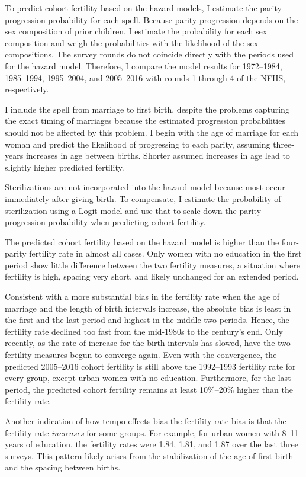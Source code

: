 \documentclass[12pt,letterpaper]{article}
\begin{document}
To predict cohort fertility based on the hazard models, I estimate the parity progression 
probability for each spell. 
Because parity progression depends on the sex composition of prior children, I estimate the 
probability for each sex composition and weigh the probabilities with the likelihood of 
the sex compositions.
The survey rounds do not coincide directly with the periods used for the hazard model.
Therefore, I compare the model results for 1972--1984, 1985--1994, 1995--2004,
and 2005--2016 with rounds 1 through 4 of the NFHS, respectively.

I include the spell from marriage to first birth, despite the problems capturing the exact 
timing of marriages because the estimated progression probabilities should not be affected 
by this problem. 
I begin with the age of marriage for each woman and predict the likelihood of progressing 
to each parity, assuming three-years increases in age between births. 
Shorter assumed increases in age lead to slightly higher predicted fertility.

Sterilizations are not incorporated into the hazard model because most occur
immediately after giving birth. 
To compensate, I estimate the probability of sterilization using a Logit model and use 
that to scale down the parity progression probability when predicting cohort fertility.

The predicted cohort fertility based on the hazard model is higher than the four-parity 
fertility rate in almost all cases. 
Only women with no education in the first period show little difference between the two 
fertility measures, a situation where fertility is high, spacing very short, and likely 
unchanged for an extended period.

Consistent with a more substantial bias in the fertility rate when the age of marriage 
and the length of birth intervals increase, the absolute bias is least in the first 
and the last period and highest in the middle two periods.
Hence, the fertility rate declined too fast from the mid-1980s to the century's end.
Only recently, as the rate of increase for the birth intervals has slowed, have the two 
fertility measures begun to converge again.
Even with the convergence, the predicted 2005--2016 cohort fertility is still above the 
1992--1993 fertility rate for every group, except urban women with no education. 
Furthermore, for the last period, the predicted cohort fertility remains at least 
10\%--20\% higher than the fertility rate.

Another indication of how tempo effects bias the fertility rate bias is that the
fertility rate \emph{increases} for some groups.
For example, for urban women with 8--11 years of education, the fertility
rates were 1.84, 1.81, and 1.87 over the last three surveys.
This pattern likely arises from the stabilization of the age of first birth and the 
spacing between births.
\end{document}

